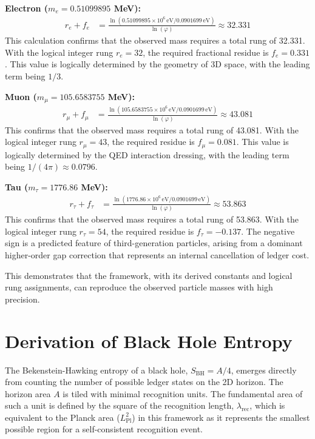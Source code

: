 \documentclass[11pt,a4paper]{article}
\begin{document}
\textbf{Electron (\(m_e = 0.51099895\) MeV):}
\begin{align*}
r_e + f_e &= \frac{\ln(0.51099895 \times 10^6 \, \text{eV} / 0.0901699 \, \text{eV})}{\ln(\varphi)} \approx 32.331
\end{align*}
This calculation confirms that the observed mass requires a total rung of 32.331. With the logical integer rung \(r_e=32\), the required fractional residue is \(f_e = 0.331\). This value is logically determined by the geometry of 3D space, with the leading term being \(1/3\).

\textbf{Muon (\(m_\mu = 105.6583755\) MeV):}
\begin{align*}
r_\mu + f_\mu &= \frac{\ln(105.6583755 \times 10^6 \, \text{eV} / 0.0901699 \, \text{eV})}{\ln(\varphi)} \approx 43.081
\end{align*}
This confirms that the observed mass requires a total rung of 43.081. With the logical integer rung \(r_\mu=43\), the required residue is \(f_\mu = 0.081\). This value is logically determined by the QED interaction dressing, with the leading term being \(1/(4\pi) \approx 0.0796\).

\textbf{Tau (\(m_\tau = 1776.86\) MeV):}
\begin{align*}
r_\tau + f_\tau &= \frac{\ln(1776.86 \times 10^6 \, \text{eV} / 0.0901699 \, \text{eV})}{\ln(\varphi)} \approx 53.863
\end{align*}
This confirms that the observed mass requires a total rung of 53.863. With the logical integer rung \(r_\tau=54\), the required residue is \(f_\tau = -0.137\). The negative sign is a predicted feature of third-generation particles, arising from a dominant higher-order gap correction that represents an internal cancellation of ledger cost.

This demonstrates that the framework, with its derived constants and logical rung assignments, can reproduce the observed particle masses with high precision.

\section{Derivation of Black Hole Entropy}
The Bekenstein-Hawking entropy of a black hole, \(S_{\text{BH}} = A/4\), emerges directly from counting the number of possible ledger states on the 2D horizon. The horizon area \(A\) is tiled with minimal recognition units. The fundamental area of such a unit is defined by the square of the recognition length, \(\lambda_{\text{rec}}\), which is equivalent to the Planck area (\(L_{\text{Pl}}^2\)) in this framework as it represents the smallest possible region for a self-consistent recognition event.
\end{document}
